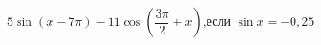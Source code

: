 \begin{ex}[type=calculate_expression]
	\begin{condition}
		\( 5\sin(x-7\pi)-11\cos\left( \dfrac{3\pi}{2}+x \right) \),\quad если \( \sin x = -0,25 \)
	\end{condition}
\end{ex}